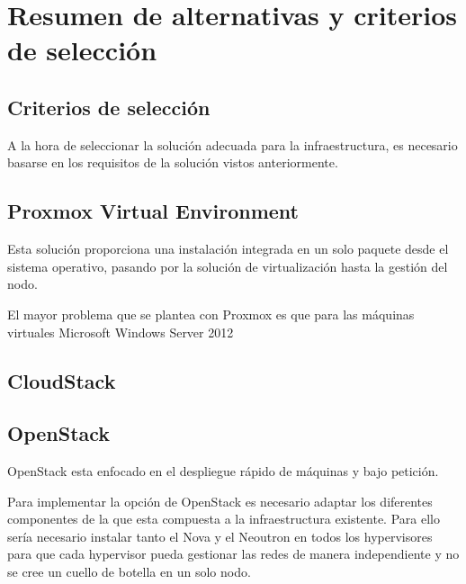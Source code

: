 \documentclass[12pt,a4paper,titlepage,twoside]{report}
\begin{document}
\chapter{Resumen de alternativas y criterios de selección}
\section{Criterios de selección}
A la hora de seleccionar la solución adecuada para la infraestructura, es necesario basarse en los requisitos de la solución vistos anteriormente.
\section{Proxmox Virtual Environment}
Esta solución proporciona una instalación integrada en un solo paquete desde el sistema operativo, pasando por la solución de virtualización hasta la gestión del nodo. 

El mayor problema que se plantea con Proxmox es que para las máquinas virtuales Microsoft Windows Server 2012
\section{CloudStack}
\section{OpenStack}
OpenStack esta enfocado en el despliegue rápido de máquinas y bajo petición.

Para implementar la opción de OpenStack es necesario adaptar los diferentes componentes de la que esta compuesta a la infraestructura existente. Para ello sería necesario instalar tanto el Nova y el Neoutron en todos los hypervisores para que cada hypervisor pueda gestionar las redes de manera independiente y no se cree un cuello de botella en un solo nodo. 
\end{document}
